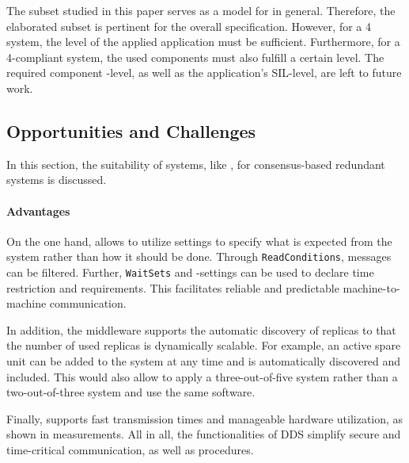 The  subset studied in this paper serves as a model for  in general.
Therefore, the elaborated  subset is pertinent for the overall  specification.
However, for a  4 system, the  level of the applied  application must be sufficient. Furthermore, for a  4-compliant system, the used components must also fulfill a certain  level.
The required component -level, as well as the  application's SIL-level, are left to future work.

\subsection{Opportunities and Challenges}

In this section, the suitability of  systems, like , for consensus-based redundant systems is discussed.

\paragraph{Advantages}
On the one hand,  allows to utilize  settings to specify what is expected from the system rather than how it should be done.
Through \texttt{ReadConditions}, messages can be filtered.
Further, \texttt{WaitSets} and -settings can be used to declare time restriction and requirements.
This facilitates reliable and predictable machine-to-machine communication.

In addition, the middleware supports the automatic discovery of replicas to that the number of used replicas is dynamically scalable.
For example, an active spare unit can be added to the system at any time and is automatically discovered and included.
This would also allow to apply a three-out-of-five system rather than a two-out-of-three system and use the same software.

Finally,  supports fast transmission times and manageable hardware utilization, as shown in measurements.
All in all, the functionalities of DDS simplify secure and time-critical communication, as well as procedures.

